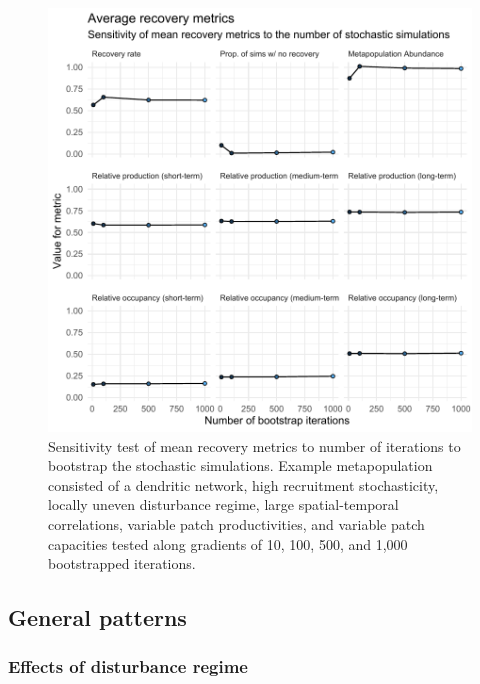 \documentclass[
]{article}
\begin{document}
\begin{figure}[H]

{\centering \includegraphics{Managing_for_ecological_surprises_in_metapopulations_files/figure-latex/bootstrap results-1} 

}

\caption{Sensitivity test of mean recovery metrics to number of iterations to bootstrap the stochastic simulations. Example metapopulation consisted of a dendritic network, high recruitment stochasticity, locally uneven disturbance regime, large spatial-temporal correlations, variable patch productivities, and variable patch capacities tested along gradients of 10, 100, 500, and 1,000 bootstrapped iterations.}\label{fig:bootstrap results}
\end{figure}
\newpage

\hypertarget{general-patterns}{%
\subsection{General patterns}\label{general-patterns}}

\hypertarget{effects-of-disturbance-regime}{%
\subsubsection{Effects of disturbance
regime}\label{effects-of-disturbance-regime}}
\end{document}
